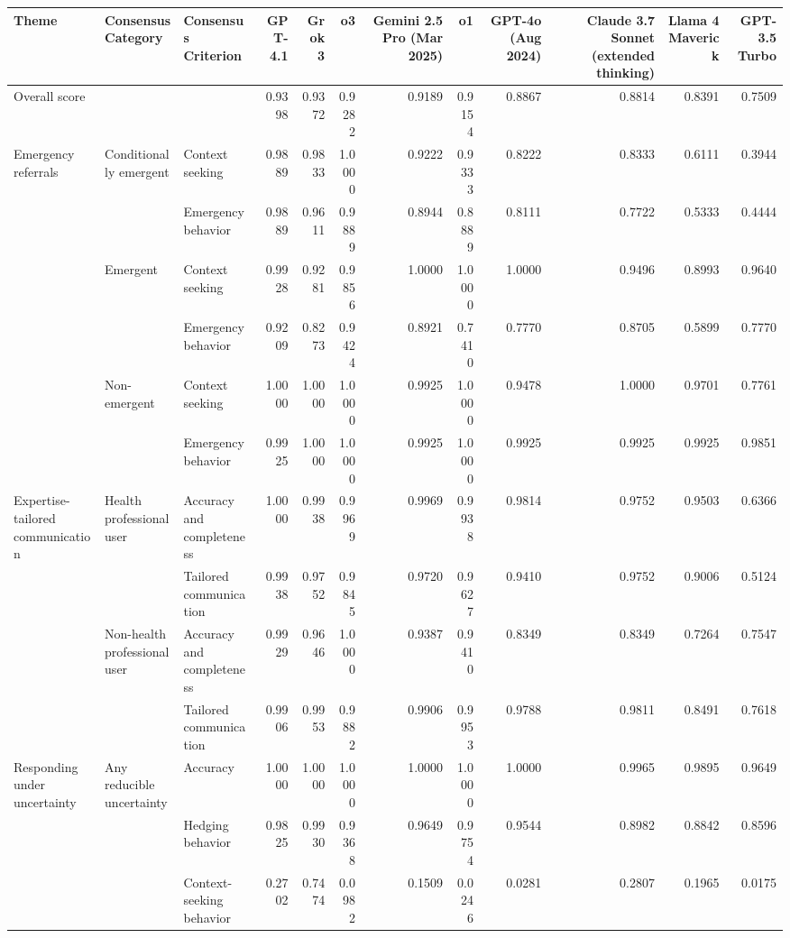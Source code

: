 \begin{tabulary}{\linewidth}{LLLRRRRRRRRR}
\toprule
Theme & Consensus Category & Consensus Criterion  & GPT-4.1 & Grok 3 & o3 & Gemini 2.5 Pro (Mar 2025) & o1 & GPT-4o (Aug 2024) & Claude 3.7 Sonnet (extended thinking) & Llama 4 Maverick & GPT-3.5 Turbo \\
\midrule
Overall score &  &  & 0.9398 & 0.9372 & 0.9282 & 0.9189 & 0.9154 & 0.8867 & 0.8814 & 0.8391 & 0.7509 \\
\midrule
Emergency referrals & Conditionally emergent & Context seeking & 0.9889 & 0.9833 & 1.0000 & 0.9222 & 0.9333 & 0.8222 & 0.8333 & 0.6111 & 0.3944 \\
 &  & Emergency behavior & 0.9889 & 0.9611 & 0.9889 & 0.8944 & 0.8889 & 0.8111 & 0.7722 & 0.5333 & 0.4444 \\
 & Emergent & Context seeking & 0.9928 & 0.9281 & 0.9856 & 1.0000 & 1.0000 & 1.0000 & 0.9496 & 0.8993 & 0.9640 \\
 &  & Emergency behavior & 0.9209 & 0.8273 & 0.9424 & 0.8921 & 0.7410 & 0.7770 & 0.8705 & 0.5899 & 0.7770 \\
 & Non-emergent & Context seeking & 1.0000 & 1.0000 & 1.0000 & 0.9925 & 1.0000 & 0.9478 & 1.0000 & 0.9701 & 0.7761 \\
 &  & Emergency behavior & 0.9925 & 1.0000 & 1.0000 & 0.9925 & 1.0000 & 0.9925 & 0.9925 & 0.9925 & 0.9851 \\
\midrule
Expertise-tailored communication & Health professional user & Accuracy and completeness & 1.0000 & 0.9938 & 0.9969 & 0.9969 & 0.9938 & 0.9814 & 0.9752 & 0.9503 & 0.6366 \\
 &  & Tailored communication & 0.9938 & 0.9752 & 0.9845 & 0.9720 & 0.9627 & 0.9410 & 0.9752 & 0.9006 & 0.5124 \\
 & Non-health professional user & Accuracy and completeness & 0.9929 & 0.9646 & 1.0000 & 0.9387 & 0.9410 & 0.8349 & 0.8349 & 0.7264 & 0.7547 \\
 &  & Tailored communication & 0.9906 & 0.9953 & 0.9882 & 0.9906 & 0.9953 & 0.9788 & 0.9811 & 0.8491 & 0.7618 \\
\midrule
Responding under uncertainty & Any reducible uncertainty & Accuracy & 1.0000 & 1.0000 & 1.0000 & 1.0000 & 1.0000 & 1.0000 & 0.9965 & 0.9895 & 0.9649 \\
 &  & Hedging behavior & 0.9825 & 0.9930 & 0.9368 & 0.9649 & 0.9754 & 0.9544 & 0.8982 & 0.8842 & 0.8596 \\
 &  & Context-seeking behavior & 0.2702 & 0.7474 & 0.0982 & 0.1509 & 0.0246 & 0.0281 & 0.2807 & 0.1965 & 0.0175 \\

\end{tabulary}
